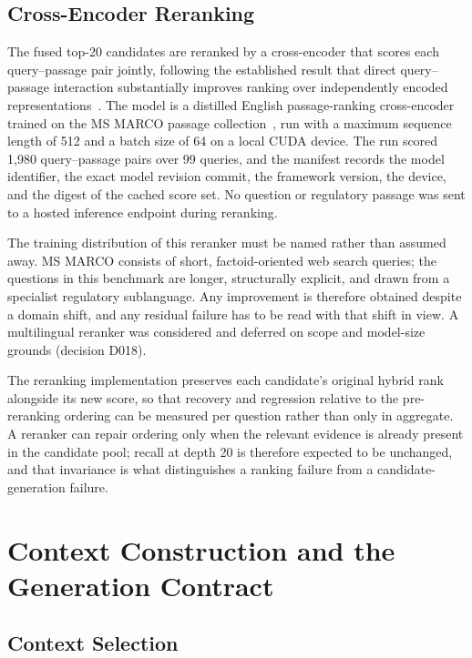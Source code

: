 \subsection{Cross-Encoder Reranking}

The fused top-20 candidates are reranked by a cross-encoder that scores each query--passage pair jointly, following the established result that direct query--passage interaction substantially improves ranking over independently encoded representations~\cite{nogueira2019reranking}. The model is a distilled English passage-ranking cross-encoder~\cite{wang2020minilm} trained on the MS MARCO passage collection~\cite{nguyen2016msmarco}, run with a maximum sequence length of 512 and a batch size of 64 on a local CUDA device. The run scored 1{,}980 query--passage pairs over 99 queries, and the manifest records the model identifier, the exact model revision commit, the framework version, the device, and the digest of the cached score set. No question or regulatory passage was sent to a hosted inference endpoint during reranking.

The training distribution of this reranker must be named rather than assumed away. MS MARCO consists of short, factoid-oriented web search queries; the questions in this benchmark are longer, structurally explicit, and drawn from a specialist regulatory sublanguage. Any improvement is therefore obtained despite a domain shift, and any residual failure has to be read with that shift in view. A multilingual reranker was considered and deferred on scope and model-size grounds (decision D018).

The reranking implementation preserves each candidate's original hybrid rank alongside its new score, so that recovery and regression relative to the pre-reranking ordering can be measured per question rather than only in aggregate. A reranker can repair ordering only when the relevant evidence is already present in the candidate pool; recall at depth 20 is therefore expected to be unchanged, and that invariance is what distinguishes a ranking failure from a candidate-generation failure.

\section{Context Construction and the Generation Contract}
\label{sec:method-context}

\subsection{Context Selection}

